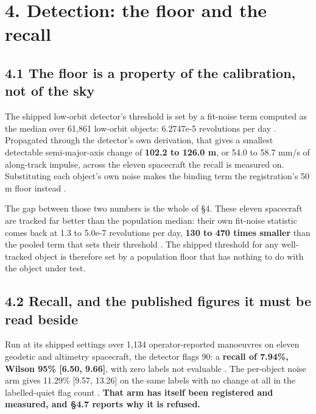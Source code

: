 \documentclass[11pt]{article}
\begin{document}
\section*{4. Detection: the floor and the recall}

\subsection*{4.1 The floor is a property of the calibration, not of the sky}

The shipped low-orbit detector's threshold is set by a fit-noise term computed as the median over 61,861 low-orbit objects: 6.2747e-5 revolutions per day%
. Propagated through the detector's own derivation, that gives a smallest detectable semi-major-axis change of \textbf{102.2 to 126.0 m}, or 54.0 to 58.7 mm/s of along-track impulse, across the eleven spacecraft the recall is measured on. Substituting each object's own noise makes the binding term the registration's 50 m floor instead%
.

The gap between those two numbers is the whole of \S{}4. These eleven spacecraft are tracked far better than the population median: their own fit-noise statistic comes back at 1.3 to 5.0e-7 revolutions per day, \textbf{130 to 470 times smaller} than the pooled term that sets their threshold%
. The shipped threshold for any well-tracked object is therefore set by a population floor that has nothing to do with the object under test.

\subsection*{4.2 Recall, and the published figures it must be read beside}

Run at its shipped settings over 1,134 operator-reported manoeuvres on eleven geodetic and altimetry spacecraft, the detector flags 90: a \textbf{recall of 7.94\%, Wilson 95\% [6.50, 9.66]}, with zero labels not evaluable%
. The per-object noise arm gives 11.29\% [9.57, 13.26] on the same labels with no change at all in the labelled-quiet flag count%
. \textbf{That arm has itself been registered and measured, and \S{}4.7 reports why it is refused.}
\end{document}
